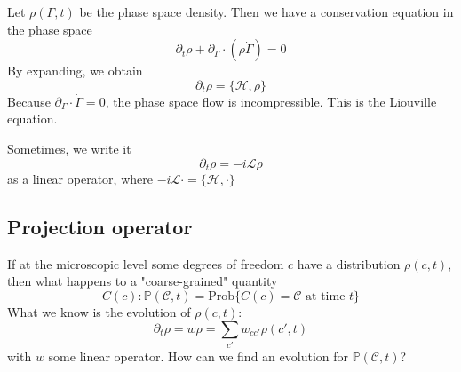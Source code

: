 \documentclass[a4paper]{book}
\theoremstyle{definition}
\theoremstyle{remark}
\begin{document}
Let $\rho(\Gamma, t)$ be the phase space density. Then we have a conservation equation in the phase space 
\begin{equation}
    \partial_t \rho + \partial_\Gamma \cdot (\rho \dot{\Gamma}) = 0
\end{equation}
By expanding, we obtain 
\begin{equation}
    \partial_t \rho = \{\mathscr{H}, \rho\}
\end{equation}
Because $\partial_\Gamma \cdot \dot\Gamma = 0$, the phase space flow is incompressible. This is the Liouville equation. \par \medskip 
Sometimes, we write it 
\begin{equation}
    \partial_t \rho = -i \mathscr{L} \rho
\end{equation}
as a linear operator, where $-i \mathscr{L}\cdot = \{\mathscr{H}, \cdot\}$

\subsection{Projection operator} 
If at the microscopic level some degrees of freedom $c$ have a distribution $\rho(c, t)$, then what happens to a "coarse-grained" quantity 
\begin{equation}
    C(c): \mathbb{P}(\mathscr{C}, t) = \text{Prob}\{C(c) = \mathscr{C} \text{ at time } t\}
\end{equation}
What we know is the evolution of $\rho(c, t)$:
\begin{equation}
    \partial_t \rho = w\rho = \sum_{c'}w_{cc'}\rho(c', t)
\end{equation}
with $w$ some linear operator. How can we find an evolution for $\mathbb{P}(\mathscr{C}, t)$? \par \medskip 
\end{document}
